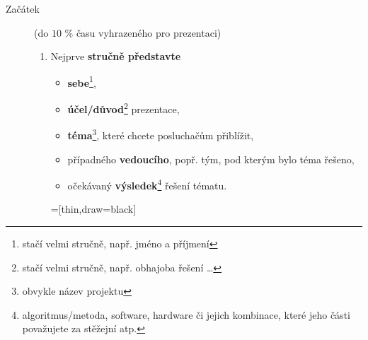 \documentclass[a4paper,11pt, twoside]{report}
\begin{document}
\begin{enumerate}
\begin{description}
  \item [Začátek] (do $10$ \% času vyhrazeného pro prezentaci) ~ 

\begin{enumerate}
\item Nejprve \textbf{stručně představte}

 
\begin{itemize}
\item
\textbf{sebe}\footnote{stačí velmi stručně, např. jméno a příjmení}, 
\item
\textbf{účel/důvod}\footnote{stačí velmi stručně, např. obhajoba řešení \ldots} prezentace, 
\item
\textbf{téma}\footnote{obvykle název projektu}, které chcete posluchačům přiblížit, 
\item
případného \textbf{vedoucího}, popř. tým, pod kterým bylo téma řešeno,
\item
očekávaný \textbf{výsledek}\footnote{algoritmus/metoda, software, hardware či jejich kombinace, které jeho části považujete za stěžejní atp.} řešení tématu.
\end{itemize}

\quad 

=[thin,draw=black]

\begin{savenotes}
\hspace{2mm}
\end{savenotes}

\vspace{1mm}



\end{enumerate}
\end{description}
\end{enumerate}
\end{document}
